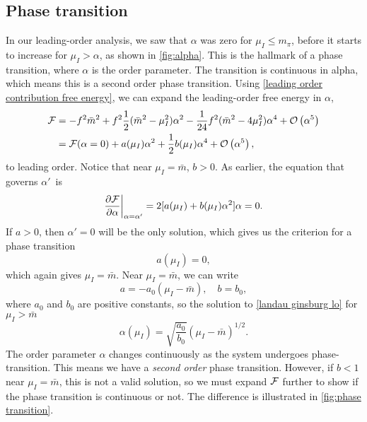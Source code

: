\subsection*{Phase transition}
In our leading-order analysis, we saw that $\alpha$ was zero for $\mu_I \leq m_\pi$, before it starts to increase for $\mu_I>\alpha$, as shown in \autoref{fig:alpha}.
This is the hallmark of a phase transition, where $\alpha$ is the order parameter.
The transition is continuous in alpha, which means this is a second order phase transition.
Using \cref{leading order contribution free energy}, we can expand the leading-order free energy in $\alpha$,
\begin{align}
    \Ef
    & = -f^2 \bar m^2 + f^2 \frac{1}{2}(\bar m^2 - \mu_I^2)\alpha^2
    - \frac{1}{24} f^2 (\bar m^2 - 4 \mu_I^2) \alpha^4 + \Oh[5]{\alpha} \\
    & = \Ef(\alpha=0) + a(\mu_I)\alpha^2 + \frac{1}{2} b(\mu_I)\alpha^4 + \Oh[5]{\alpha},
\end{align}
to leading order.
Notice that near $\mu_I = \bar m$, $b > 0$.
As earlier, the equation that governs $\alpha'$ is
\begin{equation}
    \label{landau ginsburg lo}
    \diffp{\Ef}{\alpha} \bigg|_{\alpha=\alpha'} = 2 [a(\mu_I) + b(\mu_I) \alpha^2] \alpha = 0.
\end{equation}
If $a>0$, then $\alpha' = 0$ will be the only solution, which gives us the criterion for a phase transition 
\begin{equation}
    a(\mu_I) = 0,
\end{equation}
which again gives $\mu_I = \bar m$.
Near $\mu_I = \bar m$, we can write
\begin{equation}
    a = - a_0 (\mu_I - \bar m), \quad b = b_0,
\end{equation}
where $a_0$ and $b_0$ are positive constants, so the solution to \cref{landau ginsburg lo} for $\mu_I>\bar m$
\begin{equation}
    \alpha(\mu_I) = \sqrt{\frac{a_0}{b_0}} (\mu_I - \bar m)^{1/2}.
\end{equation}
The order parameter $\alpha$ changes continuously as the system undergoes phase-transition.
This means we have a \emph{second order} phase transition.
However, if $b < 1$ near $\mu_I = \bar m$, this is not a valid solution, so we must expand $\Ef$ further to show if the phase transition is continuous or not.
The difference is illustrated in \autoref{fig:phase transition}.
